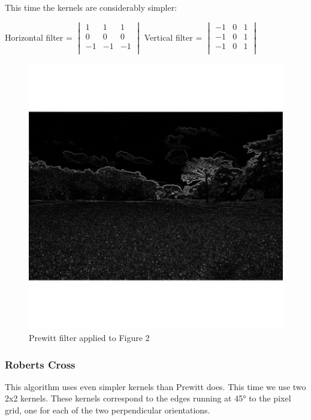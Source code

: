 \documentclass[12pt]{article}
\begin{document}
This time the kernels are considerably simpler:
\newline

Horizontal filter = $\begin{vmatrix}
        1 & 1 & 1\\
        0 & 0 & 0\\
        -1 & -1 & -1\\
\end{vmatrix}$\hspace{11mm}
Vertical filter = $\begin{vmatrix}
        -1 & 0 & 1\\
        -1 & 0 & 1\\
        -1 & 0 & 1\\
\end{vmatrix}$
\newline

\begin{figure}[h]
\centering
\includegraphics[scale = 0.45]{img/landscape_Prewitt}
\caption{Prewitt filter applied to Figure 2}
\end{figure}
\newpage

\subsubsection{Roberts Cross}
This algorithm uses even simpler kernels than Prewitt does. This time we use two 2x2 kernels. These kernels correspond to the edges running at 45° to the pixel grid, one for each of the two perpendicular orientations.
\newline
\end{document}
